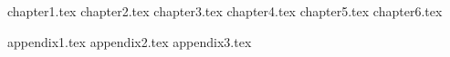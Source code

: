 \documentclass[a4paper,11pt]{book}
\begin{document}
 
\frontmatter

 
\clearpage
\thispagestyle{empty}
 
\tableofcontents
\listoffigures
\listoftables
 
\mainmatter

{chapter1.tex}
{chapter2.tex}
{chapter3.tex}
{chapter4.tex}
{chapter5.tex}
{chapter6.tex}

\appendix
{appendix1.tex}
{appendix2.tex}
{appendix3.tex}

 

 
\backmatter

\printbibliography
 
\end{document}
